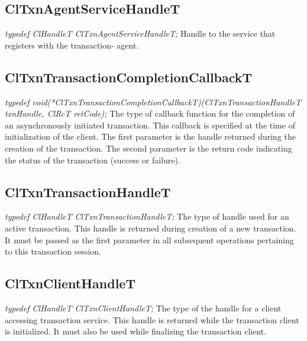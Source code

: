 \begin{flushleft}
\subsection{ClTxnAgentServiceHandleT}
\textit{typedef ClHandleT ClTxnAgentServiceHandleT;}
\newline
\newline
Handle to the service that registers with the transaction- agent.


\subsection{ClTxnTransactionCompletionCallbackT}
\textit{typedef void(*ClTxnTransactionCompletionCallbackT)(ClTxnTransactionHandleT txnHandle,
ClRcT retCode);}
\newline
\newline
 The type of callback function for the completion of an asynchronously initiated
 transaction. This callback is specified at the time of initialization of the client.
 The first parameter is the handle returned during the
 creation of the transaction. The second parameter is the return code indicating
 the status of the transaction (success or failure).




\subsection{ClTxnTransactionHandleT}
\textit{typedef ClHandleT ClTxnTransactionHandleT;}
\newline
\newline
The type of handle used for an active transaction. This handle is returned during creation of a new transaction. It must be passed as the first parameter
in all subsequent operations pertaining to this transaction session.


\subsection{ClTxnClientHandleT}
\textit{typedef ClHandleT ClTxnClientHandleT;}
\newline
\newline
  The type of the handle for a client accessing transaction service.
  This handle is returned while the transaction client is initialized.
  It must also be used while finalizing the transaction client.



\end{flushleft}
